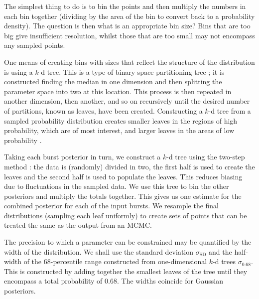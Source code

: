 \documentclass[useAMS,usedcolumn,usegraphicx,usenatbib]{mn2e}
\newcommand{\sub}[1]{\ensuremath{_\mathrm{#1}}}
\begin{document}
The simplest thing to do is to bin the points and then multiply the numbers in each bin together (dividing by the area of the bin to convert back to a probability density). The question is then what is an appropriate bin size? Bins that are too big give insufficient resolution, whilst those that are too small may not encompass any sampled points.

One means of creating bins with sizes that reflect the structure of the distribution is using a $k$-d tree. This is a type of binary space partitioning tree \citep[sections 5.2, 12.1, 12.3]{Berg2008}; it is constructed finding the median in one dimension and then splitting the parameter space into two at this location. This process is then repeated in another dimension, then another, and so on recursively until the desired number of partitions, known as leaves, have been created. Constructing a $k$-d tree from a sampled probability distribution creates smaller leaves in the regions of high probability, which are of most interest, and larger leaves in the areas of low probability \citep{Weinberg2012}.

Taking each burst posterior in turn, we construct a $k$-d tree using the two-step method \citep*{Sidery2013,Berry2013a}: the data is (randomly) divided in two, the first half is used to create the leaves and the second half is used to populate the leaves. This reduces biasing due to fluctuations in the sampled data. We use this tree to bin the other posteriors and multiply the totals together. This gives us one estimate for the combined posterior for each of the input bursts. We resample the final distributions (sampling each leaf uniformly) to create sets of points that can be treated the same as the output from an MCMC.

The precision to which a parameter can be constrained may be quantified by the width of the distribution. We shall use the standard deviation $\sigma\sub{SD}$ and the half-width of the $68$-percentile range constructed from one-dimensional $k$-d trees $\sigma_{0.68}$. This is constructed by adding together the smallest leaves of the tree until they encompass a total probability of $0.68$. The widths coincide for Gaussian posteriors.
\end{document}
